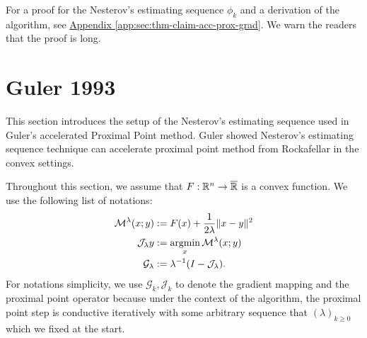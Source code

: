 \documentclass[12pt]{article}
\begin{document}
    For a proof for the Nesterov's estimating sequence $\phi_k$ and a derivation of the algorithm, see
    \hyperref[app:sec:thm-claim-acc-prox-grad]{Appendix \ref*{app:sec:thm-claim-acc-prox-grad}}. 
    We warn the readers that the proof is long. 

\section{Guler 1993}
    This section introduces the setup of the Nesterov's estimating sequence used in Guler's accelerated Proximal Point method. 
    Guler showed Nesterov's estimating sequence technique can accelerate proximal point method from Rockafellar in the convex settings. 
    
    Throughout this section, we assume that $F:\mathbb R^n \rightarrow \overline {\mathbb R}$ is a convex function. 
    We use the following list of notations: 
    \begin{align*}
        \mathcal M^{\lambda} (x; y) &:= F(x) + \frac{1}{2\lambda}\Vert x - y\Vert^2
        \\
        \mathcal J_\lambda y &:= \mathop{\rm argmin}\limits_x \mathcal M^{\lambda} (x; y)
        \\
        \mathcal G_\lambda &:= \lambda^{-1}(I - \mathcal J_\lambda). 
    \end{align*}
    For notations simplicity, we use $\mathcal G_k, \mathcal J_k$ to denote the gradient mapping and the proximal point operator because under the context of the algorithm, the proximal point step is conductive iteratively with some arbitrary sequence that $(\lambda)_{k \ge 0}$ which we fixed at the start. 
    
\end{document}
